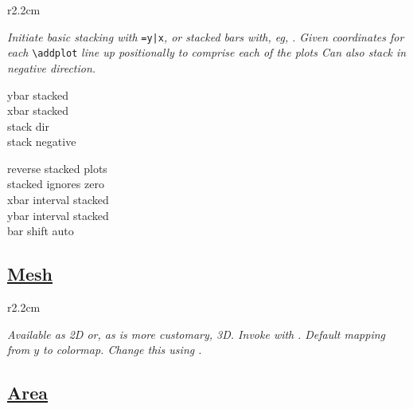 \begin{wrapfigure}[5]{r}{2.2cm}
\vspace{-8mm}
\resizebox{2cm}{!}{}
\end{wrapfigure}

\textit{Initiate basic stacking with }\href{\docurl\#pgfp./pgfplots/stack:plot}{}\texttt{=y|x}\textit{, or stacked bars with, eg, }\href{\docurl\#pgfg./pgfplots/ybar:stacked}{}\textit{. Given coordinates for each }\texttt{\textbackslash addplot}\textit{ line up positionally to comprise each of the plot\textquotesingle s  Can also stack in negative direction.}

{\color{blue}
\begin{minipage}[t]{2.5cm}
ybar stacked\\
xbar stacked\\
stack dir\\
stack negative
\end{minipage}
\begin{minipage}[t]{3.5cm}
reverse stacked plots\\
stacked ignores zero\\
xbar interval stacked\\
ybar interval stacked\\
bar shift auto
\end{minipage}}



\subsection*{\href{\docurl\#pgfp./pgfplots/z:buffer}{Mesh}}

\begin{wrapfigure}[5]{r}{2.2cm}
\vspace{-8mm}
\resizebox{2cm}{!}{}
\end{wrapfigure}

\textit{Available as 2D or, as is more customary, 3D. Invoke with }\href{pgfp\#./pgfplots/mesh}{}\textit{. Default mapping from $y$ to colormap. Change this using }\href{\docurl\#pgfp./pgfp/pgfplots/point:meta}{}\textit{.}




\subsection*{\href{\docurl\#pgfp./pgfplots/area:style}{Area}}



